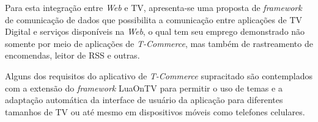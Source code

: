 Para esta integração entre \textit{Web} e TV, apresenta-se uma proposta
de \textit{framework} de comunicação de dados que possibilita a comunicação
entre aplicações de TV Digital e serviços disponíveis na \textit{Web},
o qual tem seu emprego demonstrado não somente por meio de aplicações de \textit{T-Commerce},
mas também de rastreamento de encomendas, leitor de RSS e outras.


Alguns dos requisitos do aplicativo de \textit{T-Commerce} supracitado são contemplados com a extensão
do \textit{framework} LuaOnTV para permitir o uso de temas e a adaptação
automática da interface de usuário da aplicação para diferentes 
tamanhos de TV ou até mesmo em dispositivos móveis como telefones celulares.


